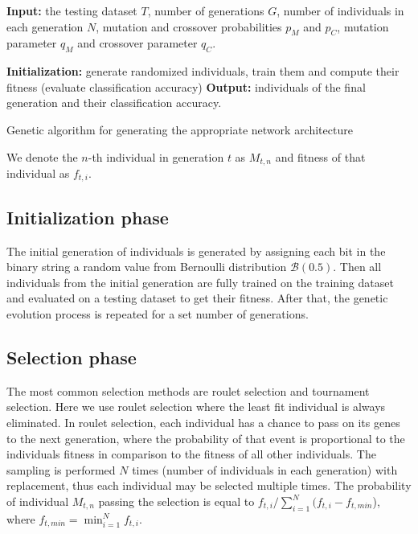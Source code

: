 \documentclass[eng]{simposium}
\begin{document}
\begin{algorithm}[H]
    \SetAlgoLined
    \textbf{Input:} the testing dataset $T$, number of generations $G$, number of individuals in each generation $N$,
    mutation and crossover probabilities $p_M$ and $p_C$, mutation parameter $q_M$ and crossover parameter $q_C$.

    \textbf{Initialization:} generate randomized individuals, train them and compute their fitness (evaluate classification accuracy)\;
     \textbf{Output:} individuals of the final generation and their classification accuracy.
     \caption{Genetic algorithm for generating the appropriate network architecture}
\end{algorithm}

We denote the $n$-th individual in generation $t$ as $M_{t,n}$ and fitness of that individual as $f_{t,i}$.

\subsection{Initialization phase}
The initial generation of individuals is generated by assigning each bit in the binary string a random value from Bernoulli distribution $\mathcal{B}(0.5)$.
Then all individuals from the initial generation are fully trained on the training dataset and evaluated on a testing dataset to get their fitness.
After that, the genetic evolution process is repeated for a set number of generations.

\subsection{Selection phase}
The most common selection methods are roulet selection and tournament selection. 
Here we use roulet selection where the least fit individual is always eliminated.
In roulet selection, each individual has a chance to pass on its genes to the next generation, 
where the probability of that event is proportional to the individuals fitness in comparison to the fitness of all other individuals.
The sampling is performed $N$ times (number of individuals in each generation) with replacement, thus each individual may be selected multiple times.
The probability of individual $M_{t,n}$ passing the selection is equal to $f_{t,i} / \sum_{i=1}^{N} (f_{t,i} - f_{t,min}$), where $f_{t, min} = \min_{i=1}^{N} {f_{t,i}}$.
\end{document}
